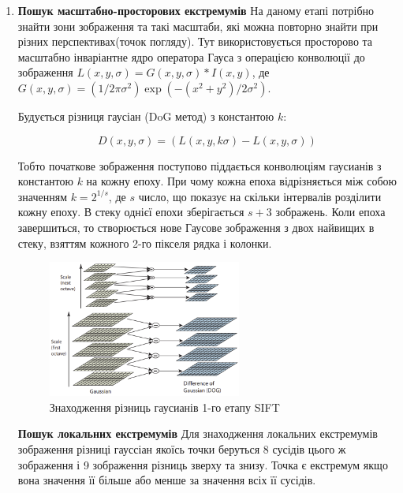 \begin{enumerate}
    \item \textbf{Пошук масштабно-просторових екстремумів}
        На даному етапі потрібно знайти зони зображення та такі масштаби, які можна повторно 
        знайти при різних перспективах(точок погляду). Тут використовується просторово та 
        масштабно інваріантне ядро оператора Гауса з операцією конволюції 
        до зображення $L(x,y,\sigma) = G(x,y,\sigma) \ast I(x,y)$, 
        де $G(x,y,\sigma) = (1/2\pi\sigma^2)\exp({-(x^2+y^2)/2\sigma^2})$.


        Будується різниця гаусіан (DoG метод) з константою $k$:

        \begin{equation}
            D(x,y,\sigma) = (L(x,y,k\sigma) - L(x,y,\sigma))
        \end{equation}

        Тобто початкове зображення поступово піддається конволюціям гаусианів з константою
        $k$ на кожну епоху. При чому кожна епоха відрізняється між собою значенням $k = 2^{1/s}$,
        де $s$ число, що показує на скільки інтервалів розділити кожну епоху.
        В стеку однієї епохи зберігається $s+3$ зображень. Коли епоха завершиться, то
        створюється нове Гаусове зображення з двох найвищих в стеку,
        взяттям кожного 2-го пікселя рядка і колонки.  

        \begin{figure}[H]
            \centering
            \includegraphics[width=0.6\textwidth]{images/sift1}
            \caption{Знаходження різниць гаусианів 1-го етапу SIFT}
            \label{fig:swift_1_step}
        \end{figure}

        \subitem \textbf{Пошук локальних екстремумів}
                Для знаходження локальних екстремумів зображення різниці гауссіан 
                якоїсь точки беруться 8 сусідів цього ж зображення і 9 зображення різниць 
                зверху та знизу. Точка є екстремум якщо вона значення її більше або менше за 
                значення всіх її сусідів.


\end{enumerate}
